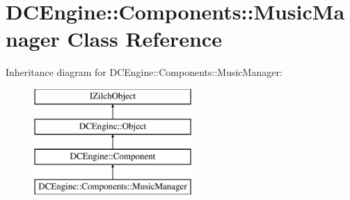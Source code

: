 \hypertarget{classDCEngine_1_1Components_1_1MusicManager}{\section{D\-C\-Engine\-:\-:Components\-:\-:Music\-Manager Class Reference}
\label{classDCEngine_1_1Components_1_1MusicManager}
}
Inheritance diagram for D\-C\-Engine\-:\-:Components\-:\-:Music\-Manager\-:\begin{figure}[H]
\begin{center}
\leavevmode
\includegraphics[height=4.000000cm]{classDCEngine_1_1Components_1_1MusicManager}
\end{center}
\end{figure}
